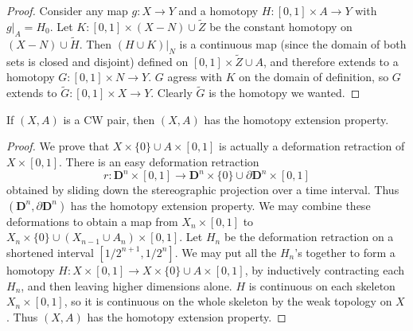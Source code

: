 \begin{proof}
    Consider any map $g: X \to Y$ and a homotopy $H: [0,1] \times A \to Y$ with $g|_A = H_0$. Let $K: [0,1] \times (X - N) \cup \widetilde{Z}$ be the constant homotopy on $(X - N) \cup \widetilde{H}$. Then $(H \cup K)|_{N}$ is a continuous map (since the domain of both sets is closed and disjoint) defined on $[0,1] \times \widetilde{Z} \cup A$, and therefore extends to a homotopy $G: [0,1] \times N \to Y$. $G$ agress with $K$ on the domain of definition, so $G$ extends to $\widetilde{G}: [0,1] \times X \to Y$. Clearly $\widetilde{G}$ is the homotopy we wanted.
\end{proof}

\begin{theorem}
    If $(X,A)$ is a CW pair, then $(X,A)$ has the homotopy extension property.
\end{theorem}
\begin{proof}
    We prove that $X \times \{ 0 \} \cup A \times [0,1]$ is actually a deformation retraction of $X \times [0,1]$. There is an easy deformation retraction
    \[ r: \mathbf{D}^n \times [0,1] \to \mathbf{D}^n \times \{ 0 \} \cup \partial \mathbf{D}^n \times [0,1] \]
    obtained by sliding down the stereographic projection over a time interval. Thus $(\mathbf{D}^n, \partial \mathbf{D}^n)$ has the homotopy extension property. We may combine these deformations to obtain a map from $X_n \times [0,1]$ to $X_n \times \{ 0 \} \cup (X_{n-1} \cup A_n) \times [0,1]$. Let $H_n$ be the deformation retraction on a shortened interval $[1/2^{n+1}, 1/2^n]$. We may put all the $H_n$'s together to form a homotopy $H: X \times [0,1] \to X \times \{ 0 \} \cup A \times [0,1]$, by inductively contracting each $H_n$, and then leaving higher dimensions alone. $H$ is continuous on each skeleton $X_n \times [0,1]$, so it is continuous on the whole skeleton by the weak topology on $X$. Thus $(X, A)$ has the homotopy extension property.
\end{proof}

